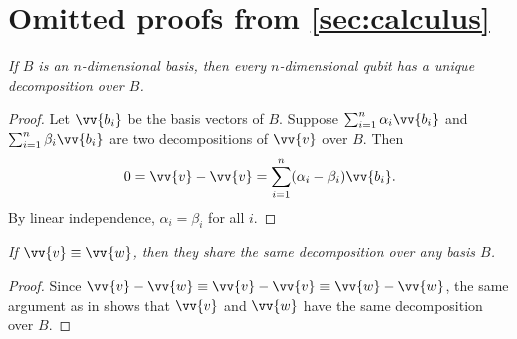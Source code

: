 \documentclass[runningheads,orivec,envcountsame,envcountsect]{llncs}
\begin{document}
%
%
%
%



\clearpage
\appendix

\section*{Omitted proofs from \ref{sec:calculus}}\label{sec:appendixA}
{}

\begin{restatetheorem}
  \itshape
  If $B$ is an $n$-dimensional basis, then every $n$-dimensional qubit has
  a unique decomposition over $B$.
\end{restatetheorem}
\begin{proof}
  Let $\vv{b_i}$ be the basis vectors of $B$. Suppose
  $\sum_{i=1}^n \alpha_i \vv{b_i}$ and $\sum_{i=1}^n \beta_i \vv{b_i}$
  are two decompositions of $\vv{v}$ over $B$. Then
  \[
    0=\vv{v}-\vv{v}=\sum_{i=1}^{n}(\alpha_i-\beta_i)\vv{b_i}.
  \]
  By linear independence, $\alpha_i=\beta_i$ for all $i$.
\end{proof}

\begin{restatecorollary}
  \itshape
  If $\vv{v}\equiv\vv{w}$, then they share the same decomposition over any
  basis $B$.
\end{restatecorollary}
\begin{proof}
  Since $\vv{v}-\vv{w}\equiv\vv{v}-\vv{v}\equiv\vv{w}-\vv{w}$, the same
  argument as in  shows that $\vv{v}$ and $\vv{w}$ have the
  same decomposition over $B$.
\end{proof}
\end{document}
